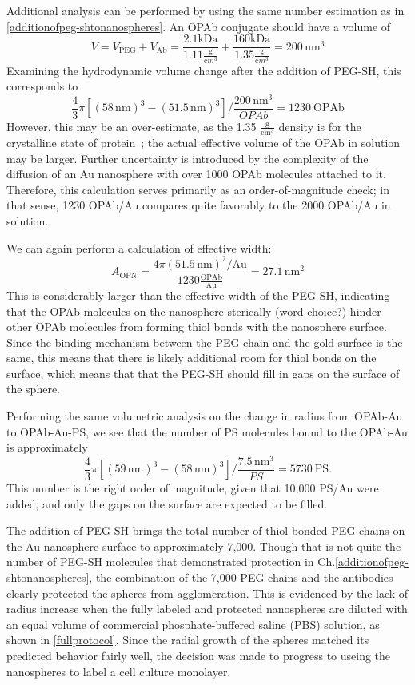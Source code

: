 Additional analysis can be performed by using the same number estimation as in \autoref{additionofpeg-shtonanospheres}. An OPAb conjugate should have a volume of
\[V=V_{\mathrm{PEG}}+V_{\mathrm{Ab}}=\frac{2.1\mathrm{kDa}}{1.11\frac{\mathrm g}{\mathrm cm^3}}+\frac{160\mathrm{kDa}}{1.35\frac{\mathrm g}{\mathrm cm^3}}=200\,\mathrm{nm}^3\]
Examining the hydrodynamic volume change after the addition of PEG-SH, this corresponds to
\[\frac{4}{3}\pi[(58\mathrm{\,nm})^3-(51.5\mathrm{\,nm})^3]/\frac{200\,\mathrm{nm}^3}{OPAb}=1230\mathrm{\ OPAb}\]
However, this may be an over-estimate, as the 1.35 $\mathrm{\frac{g}{cm^3}}$ density is for the crystalline state of protein~\citep{proteindensity}; the actual effective volume of the OPAb in solution may be larger. Further uncertainty is introduced by the complexity of the diffusion of an Au nanosphere with over 1000 OPAb molecules attached to it. Therefore, this calculation serves primarily as an order-of-magnitude check; in that sense, 1230 OPAb\slash Au compares quite favorably to the 2000 OPAb\slash Au in solution.

We can again perform a calculation of effective width: \[A_{\mathrm{OPN}}=\frac{4\pi(51.5\mathrm{\,nm})^2/\mathrm{Au}}{1230\mathrm{\frac{OPAb}{Au}}}=27.1\,\mathrm{nm}^2\]
This is considerably larger than the effective width of the PEG-SH, indicating that the OPAb molecules on the nanosphere sterically (word choice?) hinder other OPAb molecules from forming thiol bonds with the nanosphere surface. Since the binding mechanism between the PEG chain and the gold surface is the same, this means that there is likely additional room for thiol bonds on the surface, which means that that the PEG-SH should fill in gaps on the surface of the sphere.

Performing the same volumetric analysis on the change in radius from OPAb-Au to OPAb-Au-PS, we see that the number of PS molecules bound to the OPAb-Au is approximately
\[\frac{4}{3}\pi[(59\mathrm{\,nm})^3-(58\mathrm{\,nm})^3]/\frac{7.5\,\mathrm{nm}^3}{PS}=5730\mathrm{\ PS}.\]
This number is the right order of magnitude, given that 10,000 PS\slash Au were added, and only the gaps on the surface are expected to be filled.

The addition of PEG-SH brings the total number of thiol bonded PEG chains on the Au nanosphere surface to approximately 7,000. Though that is not quite the number of PEG-SH molecules that demonstrated protection in Ch.\autoref{additionofpeg-shtonanospheres}, the combination of the 7,000 PEG chains and the antibodies clearly protected the spheres from agglomeration. This is evidenced by the lack of radius increase when the fully labeled and protected nanospheres are diluted with an equal volume of commercial phosphate-buffered saline (PBS) solution, as shown in \autoref{fullprotocol}. Since the radial growth of the spheres matched its predicted behavior fairly well, the decision was made to progress to useing the nanospheres to label a cell culture monolayer.
